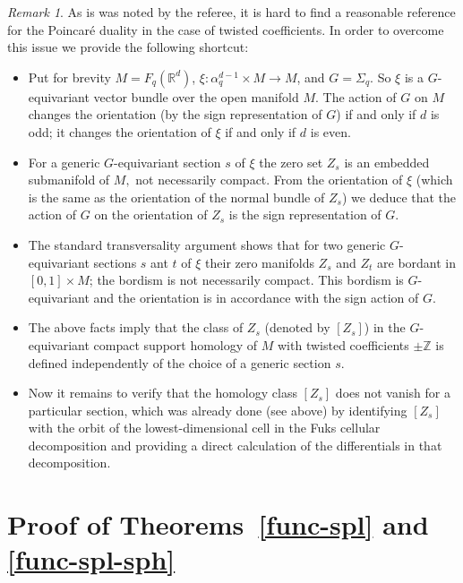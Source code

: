 \documentclass[12pt,a4paper,oneside]{amsart}
\theoremstyle{definition}
\theoremstyle{remark}
\newtheorem{rem}[thm]{Remark}
\numberwithin{equation}{section}
\begin{document}
\begin{rem}
As is was noted by the referee, it is hard to find a reasonable reference for the Poincar\'e duality in the case of twisted coefficients. In order to overcome this issue we provide the following shortcut:

\begin{itemize}
\item
Put for brevity $M = F_q(\mathbb R^d)$, $\xi : \alpha_q^{d-1}\times M\to M$, and $G=\Sigma_q$. So $\xi$ is a $G$-equivariant vector bundle over the open manifold $M$. The action of $G$ on $M$ changes the orientation (by the sign representation of $G$) if and only if $d$ is odd; it changes the orientation of $\xi$ if and only if $d$ is even.

\item
For a generic $G$-equivariant section $s$ of $\xi$ the zero set $Z_s$ is an embedded submanifold of $M,$ not necessarily compact. From the orientation of $\xi$ (which is the same as the orientation of the normal bundle of $Z_s$) we deduce that the action of $G$ on the orientation of $Z_s$ is the sign representation of $G$.

\item
The standard transversality argument shows that for two generic $G$-equivariant sections $s$ ant $t$ of $\xi$ their zero manifolds $Z_s$ and $Z_t$ are bordant in $[0, 1]\times M$; the bordism is not necessarily compact. This bordism is $G$-equivariant and the orientation is in accordance with the sign action of $G$.

\item
The above facts imply that the class of $Z_s$ (denoted by $[Z_s]$) in the $G$-equivariant compact support homology of $M$ with twisted coefficients $\pm \mathbb Z$ is defined independently of the choice of a generic section $s$.

\item
Now it remains to verify that the homology class $[Z_s]$ does not vanish for a particular section, which was already done (see above) by identifying $[Z_s]$ with the orbit of the lowest-dimensional cell in the Fuks cellular decomposition and providing a direct calculation of the differentials in that decomposition.

\end{itemize}
\end{rem}

\section{Proof of Theorems~\ref{func-spl} and \ref{func-spl-sph}}
\end{document}
